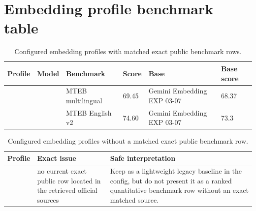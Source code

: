 \section{Embedding profile benchmark table}

\begin{table}[H]
\centering
\scriptsize
\begin{tabularx}{\textwidth}{L{1.8cm}L{2.1cm}L{1.8cm}L{1.0cm}L{2.0cm}L{1.0cm}}
\toprule
Profile & Model & Benchmark & Score & Base & Base score \\
\midrule
{} &  & MTEB multilingual & 69.45 & Gemini Embedding EXP 03-07 & 68.37 \\
 &  & MTEB English v2 & 74.60 & Gemini Embedding EXP 03-07 & 73.3 \\
\bottomrule
\end{tabularx}
\caption{Configured embedding profiles with matched exact public benchmark rows.}
\label{tab:embedding-public}
\end{table}

\begin{table}[H]
\centering
\scriptsize
\begin{tabularx}{\textwidth}{L{2.0cm}L{2.5cm}Y}
\toprule
Profile & Exact issue & Safe interpretation \\
\midrule
{} & no current exact public row located in the retrieved official sources & Keep as a lightweight legacy baseline in the config, but do not present it as a ranked quantitative benchmark row without an exact matched source. \\
\bottomrule
\end{tabularx}
\caption{Configured embedding profiles without a matched exact public benchmark row.}
\label{tab:embedding-proxy}
\end{table}
